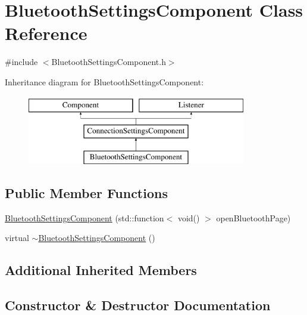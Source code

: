 \hypertarget{classBluetoothSettingsComponent}{}\section{Bluetooth\+Settings\+Component Class Reference}
\label{classBluetoothSettingsComponent}


{\ttfamily \#include $<$Bluetooth\+Settings\+Component.\+h$>$}

Inheritance diagram for Bluetooth\+Settings\+Component\+:\begin{figure}[H]
\begin{center}
\leavevmode
\includegraphics[height=3.000000cm]{classBluetoothSettingsComponent}
\end{center}
\end{figure}
\subsection*{Public Member Functions}
\begin{DoxyCompactItemize}
\item 
\mbox{\hyperlink{classBluetoothSettingsComponent_a337366f4b6a0d375131d7634554a2d0f}{Bluetooth\+Settings\+Component}} (std\+::function$<$ void() $>$ open\+Bluetooth\+Page)
\item 
virtual \mbox{\hyperlink{classBluetoothSettingsComponent_a0826ee95e3050234298f267dd3ed5285}{$\sim$\+Bluetooth\+Settings\+Component}} ()
\end{DoxyCompactItemize}
\subsection*{Additional Inherited Members}


\subsection{Constructor \& Destructor Documentation}
\mbox{\label{classBluetoothSettingsComponent_a337366f4b6a0d375131d7634554a2d0f}} 
